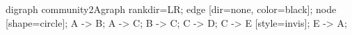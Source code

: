 digraph community\protect \T2A\textunderscore graph {
rankdir=LR;
edge [dir=none, color=black];
node [shape=circle];
A -> B;
A -> C;
B -> C;
C -> D;
C -> E [style=invis];
E -> A;
}
